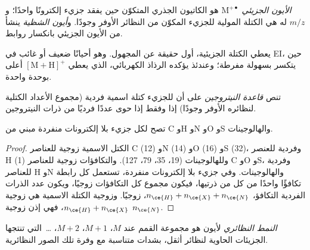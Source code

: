 \begin{definition}\label{def:b2:mass-spec-atomic:molecular-ion}
\emph{الأيون الجزيئي} $\mathrm M^{+\bullet}$ هو الكاتيون الجذري المتكوّن حين
يفقد جزيء إلكترونًا واحدًا؛ و$m/z$ له هي الكتلة المولية للجزيء المكوّن من النظائر الأوفر
وجودًا. و\emph{أيون الشظية} ينشأ من الأيون الجزيئي بانكسار
روابط.
\end{definition}

يعطي  الكتلة الجزيئية، أول حقيقة عن المجهول. وهو أحيانًا ضعيف أو
غائب في EI، حين يتكسر  بسهولة مفرطة؛ وعندئذ يؤكده الرذاذ الكهربائي، الذي يعطي $[\mathrm M +
\mathrm H]^+$ أعلى بوحدة واحدة.

\begin{definition}\label{def:b2:mass-spec-atomic:nitrogen-rule}
تنص \emph{قاعدة النيتروجين} على أن للجزيء كتلة اسمية فردية (مجموع
الأعداد الكتلية لنظائره الأوفر وجودًا) إذا وفقط إذا حوى عددًا فرديًا من ذرات
النيتروجين.
\end{definition}

\begin{proposition}\label{prop:b2:mass-spec-atomic:nitrogen-rule}
تصح  لكل جزيء بلا إلكترونات منفردة مبني من C وH وN وO وS 
والهالوجينات.
\end{proposition}

\begin{proof}
الكتل الاسمية زوجية للعناصر C (12) وN (14) وO (16) وS (32)، وفردية للعنصر H (1) وللهالوجينات (19،
35، 79، 127). والتكافؤات زوجية للعناصر C وO وS، وفردية للعناصر H وN والهالوجينات. وفي جزيء
بلا إلكترونات منفردة، تستعمل كل رابطة تكافؤًا واحدًا من كل من ذرتيها، فيكون مجموع كل
التكافؤات زوجيًا، ويكون عدد الذرات الفردية التكافؤ، $n_{\ce{H}} + n_{\ce{X}} + n_{\ce{N}}$،
زوجيًا. وزوجية الكتلة الاسمية هي زوجية $n_{\ce{H}} + n_{\ce{X}}$، فهي إذن زوجية
$n_{\ce{N}}$.
\end{proof}

\begin{definition}\label{def:b2:mass-spec-atomic:isotope-pattern}
\emph{النمط النظائري} لأيون هو مجموعة القمم عند $M$، $M+1$،
$M+2$، \dots\ التي تنتجها الجزيئات الحاوية لنظائر أثقل، بشدات متناسبة مع
وفرة تلك الصور النظائرية.
\end{definition}

